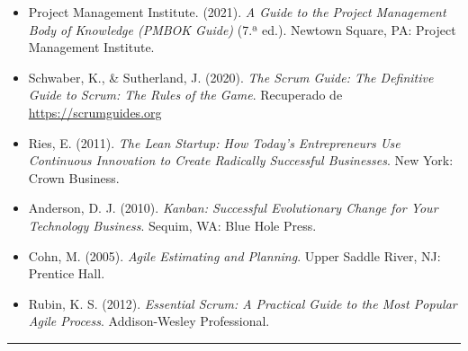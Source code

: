 \begin{itemize}
    \item Project Management Institute. (2021). \textit{A Guide to the Project Management Body of Knowledge (PMBOK Guide)} (7.ª ed.). Newtown Square, PA: Project Management Institute.
    \item Schwaber, K., \& Sutherland, J. (2020). \textit{The Scrum Guide: The Definitive Guide to Scrum: The Rules of the Game}. Recuperado de \url{https://scrumguides.org}
    \item Ries, E. (2011). \textit{The Lean Startup: How Today's Entrepreneurs Use Continuous Innovation to Create Radically Successful Businesses}. New York: Crown Business.
    \item Anderson, D. J. (2010). \textit{Kanban: Successful Evolutionary Change for Your Technology Business}. Sequim, WA: Blue Hole Press.
    \item Cohn, M. (2005). \textit{Agile Estimating and Planning}. Upper Saddle River, NJ: Prentice Hall.
    \item Rubin, K. S. (2012). \textit{Essential Scrum: A Practical Guide to the Most Popular Agile Process}. Addison-Wesley Professional.
\end{itemize}

\hrule
